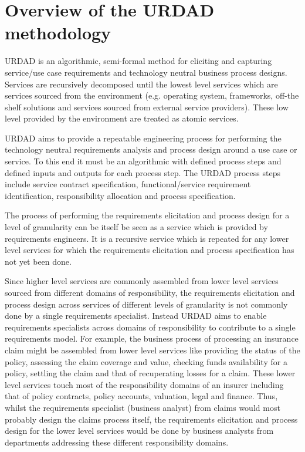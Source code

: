 \section{Overview of the URDAD methodology \label{sec:urdadMethodology}}

URDAD is an algorithmic, semi-formal method for eliciting and capturing service/use case requirements and technology neutral business process designs\cite{solms_urdad_2010}.
Services are recursively decomposed until the lowest level services which are services sourced from the environment (e.g. operating system, frameworks, off-the shelf solutions and services sourced from external service providers). These low level provided by the environment are treated as atomic services.

URDAD aims to provide a repeatable engineering process for performing the technology neutral requirements analysis and process design around a use case or service. To this end it must be an algorithmic with defined process steps and defined inputs and outputs for each process step. The URDAD process steps include service contract specification, functional/service requirement identification, responsibility allocation and process specification.

The process of performing the requirements elicitation and process design for a level of granularity can be itself be seen as a service which is provided by requirements engineers. It is a recursive service which is repeated for any lower level services for which the requirements elicitation and process specification has not yet been done.

Since higher level services are commonly assembled from lower level services sourced from different domains of responsibility, the requirements elicitation and process design across services of different levels of granularity is not commonly done by a single requirements specialist. Instead URDAD aims to enable requirements specialists across domains of responsibility to contribute to a single requirements model. For example, the business process of processing an insurance claim might be assembled from lower level services like providing the status of the policy, assessing the claim coverage and value, checking funds availability for a policy, settling the claim and that of recuperating losses for a claim. These lower level services touch most of the responsibility domains of an insurer including that of policy contracts, policy accounts, valuation, legal and finance. Thus, whilst the requirements specialist (business analyst) from claims would most probably design the claims process itself, the requirements elicitation and process design for the lower level services would be done by business analysts from departments addressing these different responsibility domains. 

